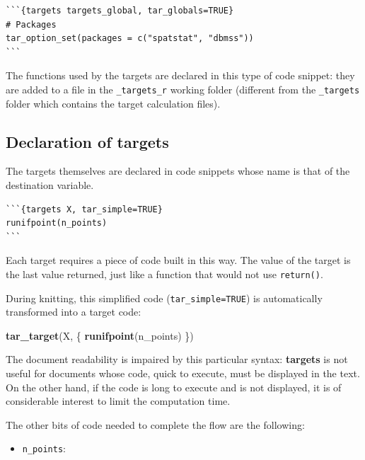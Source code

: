 \documentclass[
  12pt,
  american,
  a4paper,
  extrafontsizes,onecolumn,openright
  ]{memoir}
\newenvironment{Shaded}{\begin{snugshade}}{\end{snugshade}}
\newcommand{\FunctionTok}[1]{\textcolor[rgb]{0.13,0.29,0.53}{\textbf{#1}}}
\newcommand{\NormalTok}[1]{#1}
\providecommand{\tightlist}{%
  \setlength{\itemsep}{0pt}\setlength{\parskip}{0pt}}
\begin{document}
\begin{verbatim}
```{targets targets_global, tar_globals=TRUE}
# Packages
tar_option_set(packages = c("spatstat", "dbmss"))
```
\end{verbatim}

The functions used by the targets are declared in this type of code snippet: they are added to a file in the \texttt{\_targets\_r} working folder (different from the \texttt{\_targets} folder which contains the target calculation files).

\subsection{Declaration of targets}\label{declaration-of-targets}

The targets themselves are declared in code snippets whose name is that of the destination variable.

\begin{verbatim}
```{targets X, tar_simple=TRUE}
runifpoint(n_points)
```
\end{verbatim}

Each target requires a piece of code built in this way.
The value of the target is the last value returned, just like a function that would not use \texttt{return()}.

During knitting, this simplified code (\texttt{tar\_simple=TRUE}) is automatically transformed into a target code:

\scriptsize

\begin{Shaded}
\begin{Highlighting}[]
\FunctionTok{tar\_target}\NormalTok{(X, \{}
  \FunctionTok{runifpoint}\NormalTok{(n\_points)}
\NormalTok{\})}
\end{Highlighting}
\end{Shaded}

\normalsize

The document readability is impaired by this particular syntax: \textbf{targets} is not useful for documents whose code, quick to execute, must be displayed in the text.
On the other hand, if the code is long to execute and is not displayed, it is of considerable interest to limit the computation time.

The other bits of code needed to complete the flow are the following:

\begin{itemize}
\tightlist
\item
  \texttt{n\_points}:
\end{itemize}
\end{document}
